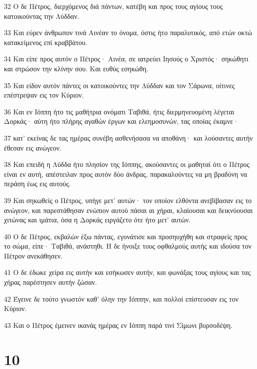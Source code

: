 \par 32 Ο δε Πέτρος, διερχόμενος διά πάντων, κατέβη και προς τους αγίους τους κατοικούντας την Λύδδαν.
\par 33 Και εύρεν άνθρωπον τινά Αινέαν το όνομα, όστις ήτο παραλυτικός, από ετών οκτώ κατακείμενος επί κραββάτου.
\par 34 Και είπε προς αυτόν ο Πέτρος· Αινέα, σε ιατρεύει Ιησούς ο Χριστός· σηκώθητι και στρώσον την κλίνην σου. Και ευθύς εσηκώθη.
\par 35 Και είδον αυτόν πάντες οι κατοικούντες την Λύδδαν και τον Σάρωνα, οίτινες επέστρεψαν εις τον Κύριον.
\par 36 Και εν Ιόππη ήτο τις μαθήτρια ονόματι Ταβιθά, ήτις διερμηνευομένη λέγεται Δορκάς· αύτη ήτο πλήρης αγαθών έργων και ελεημοσυνών, τας οποίας έκαμνε·
\par 37 κατ' εκείνας δε τας ημέρας συνέβη ασθενήσασα να αποθάνη· και λούσαντες αυτήν έθεσαν εις ανώγεον.
\par 38 Και επειδή η Λύδδα ήτο πλησίον της Ιόππης, ακούσαντες οι μαθηταί ότι ο Πέτρος είναι εν αυτή, απέστειλαν προς αυτόν δύο άνδρας, παρακαλούντες να μη βραδύνη να περάση έως εις αυτούς.
\par 39 Και σηκωθείς ο Πέτρος, υπήγε μετ' αυτών· τον οποίον ελθόντα ανεβίβασαν εις το ανώγεον, και παρεστάθησαν ενώπιον αυτού πάσαι αι χήραι, κλαίουσαι και δεικνύουσαι χιτώνας και ιμάτια, όσα η Δορκάς ειργάζετο ότε ήτο μετ' αυτών.
\par 40 Ο δε Πέτρος, εκβαλών έξω πάντας, εγονάτισε και προσηυχήθη και στραφείς προς το σώμα, είπε· Ταβιθά, ανάστηθι. Η δε ήνοιξε τους οφθαλμούς αυτής και ιδούσα τον Πέτρον ανεκάθησεν.
\par 41 Ο δε έδωκε χείρα εις αυτήν και εσήκωσεν αυτήν, και φωνάξας τους αγίους και τας χήρας παρέστησεν αυτήν ζώσαν.
\par 42 Έγεινε δε τούτο γνωστόν καθ' όλην την Ιόππην, και πολλοί επίστευσαν εις τον Κύριον.
\par 43 Και ο Πέτρος έμεινεν ικανάς ημέρας εν Ιόππη παρά τινί Σίμωνι βυρσοδέψη.

\chapter{10}

